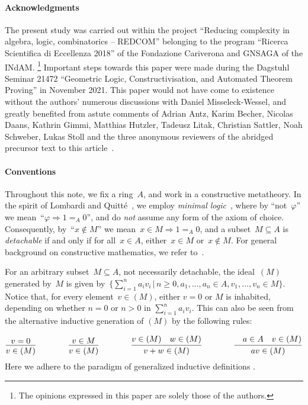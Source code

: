 \documentclass[com,11pt,crcready]{iosart2x}
\theoremstyle{definition}
\theoremstyle{plain}
\theoremstyle{remark}
\newcommand{\?}{\,{:}\,}
\renewcommand{\_}{\mathpunct{.}\,}
\begin{document}
\paragraph{Acknowledgments}
The present study was carried out within the project ``Reducing complexity in
algebra, logic, combinatorics -- REDCOM'' belonging to the program ``Ricerca
Scientifica di Eccellenza 2018'' of the Fondazione Cariverona and GNSAGA of the INdAM.%
\footnote{The opinions expressed in this paper are solely those of the
authors.} Important steps towards this paper were made
during the Dagstuhl Seminar 21472 ``Geometric Logic, Constructivisation, and
Automated Theorem Proving'' in November 2021. This paper would not have come to
existence without the authors' numerous discussions with Daniel Misseleck-Wessel, and
greatly benefited from astute comments of Adrian Antz, Karim Becher, Nicolas Daans, Kathrin Gimmi, Matthias Hutzler,
Tadeusz Litak, Christian Sattler,
Noah Schweber, Lukas Stoll and the three anonymous reviewers of the abridged
precursor text to this
article~\cite{blechschmidt-schuster:constructive-maximal-ideals}.

\paragraph{Conventions} Throughout this note, we fix a ring~$A$, and work in a constructive metatheory.
In the spirit of Lombardi and Quitté~\cite{lombardi-quitte:constructive-algebra}, we employ \emph{minimal
logic}~\cite{johansson:minimal}, where by ``not~$\varphi$'' we mean~``$\varphi \Rightarrow 1 =_A 0$'', and do \emph{not} assume any form of the axiom of choice. Consequently,
by~``$x \not\in M$'' we mean~$x \in M \Rightarrow 1 =_A 0$, and a subset~$M
\subseteq A$ is \emph{detachable} if and only if for all~$x \in A$, either~$x \in M$
or~$x \not\in M$. For general background on constructive mathematics, we refer
to~\cite{bauer:five-stages,bauer:int-mathematics,sep:constructive-mathematics}.

For an arbitrary subset~$M \subseteq A$, not necessarily
detachable, the ideal~$(M)$ generated by~$M$ is given by~$\bigl\{ \sum_{i=1}^n
a_i v_i \,\Big|\, n \geq 0, a_1,\ldots,a_n \in A, v_1,\ldots,v_n \in M \bigr\}$.
Notice that, for every element~$v \in (M)$, either $v = 0$ or $M$ is inhabited, depending on whether
$n=0$ or $n>0$ in $\sum_{i=1}^n a_i v_i$. This can also be seen from the alternative inductive
generation of $(M)$ by the following rules:\par
{\vspace*{-0.8em}\small\[
\infer{v \in (M)}{v=0}
\qquad\qquad
\infer{v \in (M)}{v \in M}
\qquad\qquad
\infer{v+w \in (M)}{v \in (M)\quad w \in (M)}
\qquad\qquad
\infer{av \in (M)}{\quad a\in A \quad v \in (M)}
\]}%
\noindent Here we adhere to the paradigm of generalized inductive definitions
\cite{aczel-rathjen:notes,aczel-rathjen:cstdraft,rathjen:genind,aczel:ind}.
\end{document}
